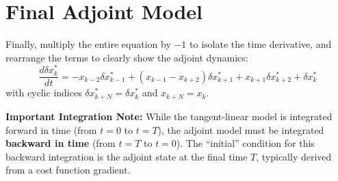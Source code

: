 \documentclass[11pt]{article}
\begin{document}
\section{Final Adjoint Model}

Finally, multiply the entire equation by $-1$ to isolate the time derivative, and rearrange the terms to clearly show the adjoint dynamics:
\begin{equation}
    \boxed{\frac{d \delta x_k^*}{dt} = -x_{k-2} \delta x_{k-1}^* + (x_{k-1} - x_{k+2}) \delta x_{k+1}^* + x_{k+1} \delta x_{k+2}^* + \delta x_k^*}
\end{equation}
with cyclic indices $\delta x_{k+N}^* = \delta x_k^*$ and $x_{k+N} = x_k$.

\vspace{0.5cm}
\noindent \textbf{Important Integration Note:}
While the tangent-linear model is integrated forward in time (from $t=0$ to $t=T$), the adjoint model must be integrated \textbf{backward in time} (from $t=T$ to $t=0$). The ``initial'' condition for this backward integration is the adjoint state at the final time $T$, typically derived from a cost function gradient.
\end{document}
